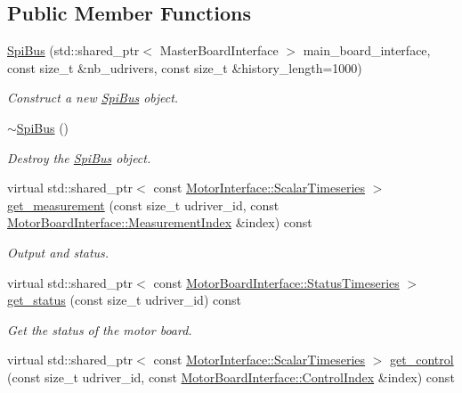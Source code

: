 \subsection*{Public Member Functions}
\begin{DoxyCompactItemize}
\item 
\hyperlink{classblmc__drivers_1_1SpiBus_a020b550fdd3c00a5361f0bee0382dbe2}{Spi\+Bus} (std\+::shared\+\_\+ptr$<$ Master\+Board\+Interface $>$ main\+\_\+board\+\_\+interface, const size\+\_\+t \&nb\+\_\+udrivers, const size\+\_\+t \&history\+\_\+length=1000)
\begin{DoxyCompactList}\small\item\em Construct a new \hyperlink{classblmc__drivers_1_1SpiBus}{Spi\+Bus} object. \end{DoxyCompactList}\item 
\hyperlink{classblmc__drivers_1_1SpiBus_a0c711c24c403c532c5d5bccfa5c1dc68}{$\sim$\+Spi\+Bus} ()
\begin{DoxyCompactList}\small\item\em Destroy the \hyperlink{classblmc__drivers_1_1SpiBus}{Spi\+Bus} object. \end{DoxyCompactList}\item 
virtual std\+::shared\+\_\+ptr$<$ const \hyperlink{classblmc__drivers_1_1MotorInterface_a49b8fc916b9f9debbd7b0988463db5cd}{Motor\+Interface\+::\+Scalar\+Timeseries} $>$ \hyperlink{classblmc__drivers_1_1SpiBus_a57e12fc52e0d499344a7fc858256118e}{get\+\_\+measurement} (const size\+\_\+t udriver\+\_\+id, const \hyperlink{classblmc__drivers_1_1MotorBoardInterface_a8e869cbdb9fcc872ba5a33813e0dfafb}{Motor\+Board\+Interface\+::\+Measurement\+Index} \&index) const 
\begin{DoxyCompactList}\small\item\em Output and status. \end{DoxyCompactList}\item 
virtual std\+::shared\+\_\+ptr$<$ const \hyperlink{classblmc__drivers_1_1MotorBoardInterface_ae3777e484dda60c4abe87f2b542ddfb8}{Motor\+Board\+Interface\+::\+Status\+Timeseries} $>$ \hyperlink{classblmc__drivers_1_1SpiBus_a573b8d5797abaec646a6f14e019f9c24}{get\+\_\+status} (const size\+\_\+t udriver\+\_\+id) const 
\begin{DoxyCompactList}\small\item\em Get the status of the motor board. \end{DoxyCompactList}\item 
virtual std\+::shared\+\_\+ptr$<$ const \hyperlink{classblmc__drivers_1_1MotorInterface_a49b8fc916b9f9debbd7b0988463db5cd}{Motor\+Interface\+::\+Scalar\+Timeseries} $>$ \hyperlink{classblmc__drivers_1_1SpiBus_a237dcb74daf33f6ec7c930573ce4d17d}{get\+\_\+control} (const size\+\_\+t udriver\+\_\+id, const \hyperlink{classblmc__drivers_1_1MotorBoardInterface_a82ed4d0fa527521707281396095a88ca}{Motor\+Board\+Interface\+::\+Control\+Index} \&index) const 

\end{DoxyCompactItemize}

